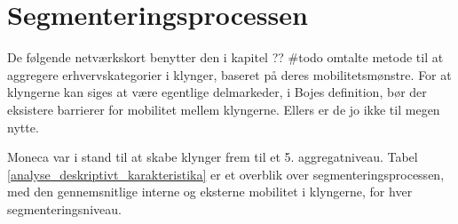 % 
% 
% 
% 
% 






%  
% 


\section{Segmenteringsprocessen \label{analyse_deskriptivt_segmenteringsproces}}

De følgende netværkskort benytter den i kapitel ?? \#todo omtalte metode til at aggregere erhvervskategorier i klynger, baseret på deres mobilitetsmønstre. For at klyngerne kan siges at være egentlige delmarkeder, i Bojes definition, bør der eksistere barrierer for mobilitet mellem klyngerne. Ellers er de jo ikke til megen nytte.

Moneca var i stand til at skabe klynger frem til et 5. aggregatniveau. Tabel \ref{analyse_deskriptivt_karakteristika}  er et overblik over segmenteringsprocessen, med den gennemsnitlige interne og eksterne mobilitet i klyngerne, for hver segmenteringsniveau.

% 
\begin{table}[H] \centering
\caption{Karakteristika for segmenteringsprocessen}
\label{tab_analyse_deskriptivt_karakteristika}
\end{table}
%

